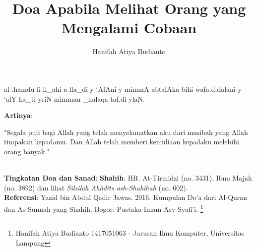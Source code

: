 \documentclass[a4paper,12pt]{article}
\title{\Large Doa Apabila Melihat Orang yang Mengalami Cobaan}
\author{\calligra Hanifah Atiya Budianto}
\begin{document}
\sffamily
\maketitle 
\fullvocalize
{}
\begin{arabtext}
\noindent
al-.hamdu li-ll_ahi a-lla_di-y `AfAni-y mimmA abtalAka bihi wafa.d.dalani-y 
`alY ka_ti-yriN mimman _halaqa taf.di-ylaN.\\
\end{arabtext}
\noindent
\textbf{Artinya}:
\par
\indent
"Segala puji bagi Allah yang telah menyelamatkan aku dari musibah yang 
Allah timpakan kepadamu. Dan Allah telah memberi kemuliaan kepadaku 
melebihi orang banyak."\\\\
\par
\noindent
\textbf{Tingkatan Doa dan Sanad}: \textbf{Shahih}: HR. At-Tirmidzi (no. 
3431), Ibnu Majah (no. 3892) dan lihat \textit{Silsilah Ah\^{a}d\^{i}ts 
ash-Shah\^{i}hah} (no. 602). \\
\textbf{Referensi}: Yazid bin Abdul Qadir Jawas. 2016. Kumpulan Do'a dari
Al-Quran dan As-Sunnah yang Shahih. Bogor: Pustaka Imam Asy-Syafi'i.
\footnote{Hanifah Atiya Budianto 1417051063 - Jurusan Ilmu Komputer,
Universitas Lampung}
\end{document}
